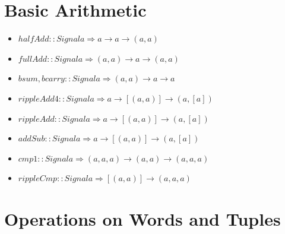\documentclass[a4paper,openany,fleqn]{book}
\begin{document}
\section{Basic Arithmetic}
\label{sec:basic-arithmetic}

\begin{itemize}
\item $halfAdd :: Signal a \Rightarrow a \rightarrow a \rightarrow (a,a)$
\item $fullAdd :: Signal a \Rightarrow (a,a) \rightarrow a \rightarrow (a,a)$
\item $bsum, bcarry :: Signal a \Rightarrow (a,a) \rightarrow a \rightarrow a$
\item $rippleAdd4 :: Signal a \Rightarrow a \rightarrow [(a,a)] \rightarrow (a,[a])$
\item $rippleAdd :: Signal a \Rightarrow a \rightarrow [(a,a)] \rightarrow (a,[a])$
\item $addSub :: Signal a \Rightarrow a \rightarrow [(a,a)] \rightarrow (a,[a])$
\item $cmp1 :: Signal a \Rightarrow (a,a,a) \rightarrow (a,a) \rightarrow (a,a,a)$
\item $rippleCmp :: Signal a \Rightarrow [(a,a)] \rightarrow (a,a,a)$
\end{itemize}


\section{Operations on Words and Tuples}
\label{sec:operations-words}
\end{document}
